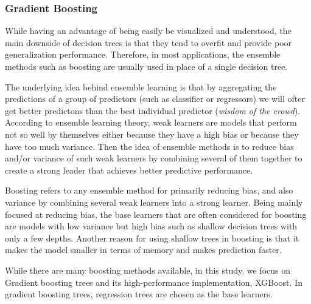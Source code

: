 \subsubsection*{Gradient Boosting}

While having an advantage of being easily be visualized and understood, the main
downside of decision trees is that they tend to overfit and provide poor
generalization performance. Therefore, in most applications, the ensemble
methods such as boosting are usually used in place of a single decision tree.

The underlying idea behind ensemble learning is that by aggregating the
predictions of a group of predictors (such as classifier or regressors) we will
ofter get better predictons than the best individual predictor (\textit{wisdom of the
crowd}).
According to ensemble learning theory, weak learners are models that perform not
so well by themselves either because they have a high bias or because they have
too much variance. Then the idea of ensemble methods is to reduce bias and/or
variance of such weak learners by combining several of them together to create a
strong leader that achieves better predictive performance.

Boosting refers to any ensemble method for primarily reducing bias, and also
variance by combining several weak learners into  a strong learner.  Being
mainly focused at reducing bias, the base learners that are often considered for
boosting are models with low variance but high bias such as shallow decision
trees with only a few depths.
Another reason for using shallow trees in boosting is that it makes the model
smaller in terms of memory and makes prediction faster.


While there are many boosting methods available, in this study, we focus on
Gradient boosting trees and its high-performance implementation, XGBoost. In
gradient boosting trees,  regression trees are chosen  as the base learners.

